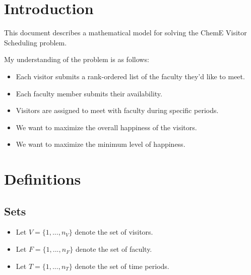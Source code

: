 \documentclass[12pt]{article}
\theoremstyle{definition}
\newtheorem{definition set}{Definition Set}%
\newtheorem{problem statement}{Problem Statement} %
\theoremstyle{remark}
\theoremstyle{remark}
\begin{document}
\maketitle

\section{Introduction}
This document describes a mathematical model for solving the ChemE Visitor Scheduling problem.

My understanding of the problem is as follows:
\begin{itemize}
\item
Each visitor submits a rank-ordered list of the faculty they\rq{}d like to meet.

\item
Each faculty member submits their availability.

\item
Visitors are assigned to meet with faculty during specific periods.

\item
We want to maximize the overall happiness of the visitors.

\item
We want to maximize the minimum level of happiness.
\end{itemize}

\section{Definitions}
\subsection{Sets}
\begin{itemize}
\item
Let $V = \{1,...,n_V\}$ denote the set of visitors.

\item
Let $F = \{1,...,n_F\}$ denote the set of faculty.

\item
Let $T = \{1,...,n_T\}$ denote the set of time periods.
\end{itemize}
\end{document}
